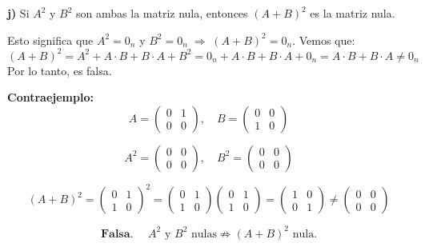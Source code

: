 \documentclass[a4paper,12pt]{article}
\begin{document}
\begin{ejercicio}[title=Ejercicio 42 (⋆)]
\textbf{j)} Si $A^2$ y $B^2$ son ambas la matriz nula, entonces $(A + B)^2$ es la matriz nula.

\vspace{0.5em}

Esto significa que $A^2 = 0_n$ y $B^2 = 0_n \;\Rightarrow\; (A + B)^2 = 0_n$.  
Vemos que:
\[
(A + B)^2 = A^2 + A \cdot B + B \cdot A + B^2 = 0_n + A \cdot B + B \cdot A + 0_n = A \cdot B + B \cdot A \neq 0_n
\]
Por lo tanto, es falsa.

\vspace{0.5em}

\textbf{Contraejemplo:}
\[
A = \begin{pmatrix}0 & 1 \\ 0 & 0\end{pmatrix}, \quad
B = \begin{pmatrix}0 & 0 \\ 1 & 0\end{pmatrix}
\]

\[
A^2 = \begin{pmatrix}0 & 0 \\ 0 & 0\end{pmatrix}, \quad
B^2 = \begin{pmatrix}0 & 0 \\ 0 & 0\end{pmatrix}
\]

\[
(A + B)^2 = \begin{pmatrix}0 & 1 \\ 1 & 0\end{pmatrix}^2
= \begin{pmatrix}0 & 1 \\ 1 & 0\end{pmatrix}
\begin{pmatrix}0 & 1 \\ 1 & 0\end{pmatrix}
= \begin{pmatrix}1 & 0 \\ 0 & 1\end{pmatrix}
\neq \begin{pmatrix}0 & 0 \\ 0 & 0\end{pmatrix}
\]

\[
\boxed{\textbf{Falsa. }\quad A^2 \text{ y } B^2 \text{ nulas} \not\Rightarrow (A + B)^2 \text{ nula.}}
\]

\vspace{1em}


\end{ejercicio}
\end{document}

